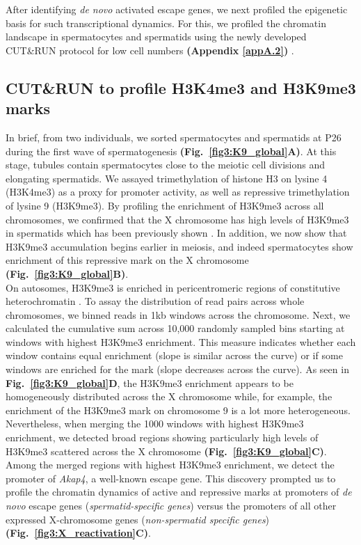 After identifying \emph{de novo} activated escape genes, we next profiled the epigenetic basis for such transcriptional dynamics. For this, we profiled the chromatin landscape in spermatocytes and spermatids using the newly developed CUT\&{}RUN protocol for low cell numbers \textbf{(Appendix \ref{appA.2})} \citep{Skene2018}. 

\subsection{CUT\&{}RUN to profile H3K4me3 and H3K9me3 marks}

In brief, from two individuals, we sorted spermatocytes and spermatids at P26 during the first wave of spermatogenesis \textbf{(Fig.~\ref{fig3:K9_global}A)}. At this stage, tubules contain spermatocytes close to the meiotic cell divisions and elongating spermatids. We assayed trimethylation of histone H3 on lysine 4 (H3K4me3) as a proxy for promoter activity, as well as repressive trimethylation of lysine 9 (H3K9me3). By profiling the enrichment of H3K9me3 across all chromosomes, we confirmed that the X chromosome has high levels of H3K9me3 in spermatids which has been previously shown \citep{Moretti2016, Greaves2006, Tachibana2007}. In addition, we now show that H3K9me3 accumulation begins earlier in meiosis, and indeed spermatocytes show enrichment of this repressive mark on the X chromosome \textbf{(Fig.~\ref{fig3:K9_global}B)}. \\

On autosomes, H3K9me3 is enriched in pericentromeric regions of constitutive heterochromatin \citep{Peters2001}. To assay the distribution of read pairs across whole chromosomes, we binned reads in 1kb windows across the chromosome. Next, we calculated the cumulative sum across 10,000 randomly sampled bins starting at windows with highest H3K9me3 enrichment. This measure indicates whether each window contains equal enrichment (slope is similar across the curve) or if some windows are enriched for the mark (slope decreases across the curve). As seen in \textbf{Fig.~\ref{fig3:K9_global}D}, the H3K9me3 enrichment appears to be homogeneously distributed across the X chromosome while, for example, the enrichment of the H3K9me3 mark on chromosome 9 is a lot more heterogeneous. \\

Nevertheless, when merging the 1000 windows with highest H3K9me3 enrichment, we detected broad regions showing particularly high levels of H3K9me3 scattered across the X chromosome \textbf{(Fig.~\ref{fig3:K9_global}C)}. Among the merged regions with highest H3K9me3 enrichment, we detect the promoter of \textit{Akap4}, a well-known escape gene. This discovery prompted us to profile the chromatin dynamics of active and repressive marks at promoters of \emph{de novo} escape genes (\emph{spermatid-specific genes}) versus the promoters of all other expressed X-chromosome genes (\emph{non-spermatid specific genes}) \textbf{(Fig.~\ref{fig3:X_reactivation}C)}.

